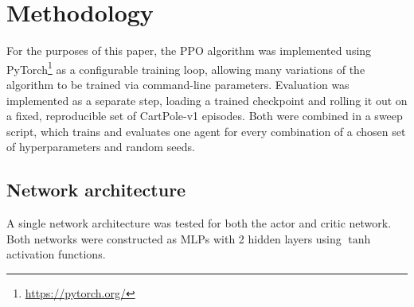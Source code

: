 \documentclass{article}
\begin{document}
\section{Methodology}
\label{sec:methodology}

For the purposes of this paper, the PPO algorithm was implemented using PyTorch\footnote{\url{https://pytorch.org/}} as a configurable training loop, allowing many variations of the algorithm to be trained via command-line parameters. Evaluation was implemented as a separate step, loading a trained checkpoint and rolling it out on a fixed, reproducible set of CartPole-v1 episodes. Both were combined in a sweep script, which trains and evaluates one agent for every combination of a chosen set of hyperparameters and random seeds.

\subsection{Network architecture}

A single network architecture was tested for both the actor and critic network. Both networks were constructed as MLPs with 2 hidden layers using \(\tanh\) activation functions.
\end{document}
